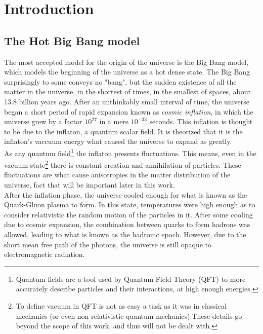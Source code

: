 \chapter{Introduction}

\section{The Hot Big Bang model}

The most accepted model for the origin of the universe is the Big Bang model, which models the beginning of the universe as a hot dense state. The Big Bang surprisingly to some conveys no "bang", but the sudden existence of all the matter in the universe, in the shortest of times, in the smallest of spaces, about 13.8 billion years ago. After an unthinkably small interval of time, the universe began a short period of rapid expansion known as \textit{cosmic inflation}, in which the universe grew by a factor $10^{27}$ in a mere $10^{-33}$ seconds. This inflation is thought to be due to the inflaton, a quantum scalar field. It is theorized that it is the inflaton's vaccuum energy what caused the universe to expand as greatly. \\

As any quantum field\footnote{Quantum fields are a tool used by Quantum Field Theory (QFT) to more accurately describe particles and their interactions, at high enough energies.} the inflaton presents fluctuations. This means, even in the vacuum state\footnote{To define vacuum in QFT is not as easy a task as it was in classical mechanics (or even non-relativistic quantum mechanics).These details go beyond the scope of this work, and thus will not be dealt with.} there is constant creation and annihilation of particles. These fluctuations are what cause anisotropies in the matter distribution of the universe, fact that will be important later in this work. \\

After the inflation phase, the universe cooled enough for what is known as the Quark-Gluon plasma to form. In this state, temperatures were high enough as to consider relativistic the random motion of the particles in it. After some cooling due to cosmic expansion, the combination between quarks to form hadrons was allowed, leading to what is known as the hadronic epoch. However, due to the short mean free path of the photons, the universe is still opaque to electromagnetic radiation. \\

